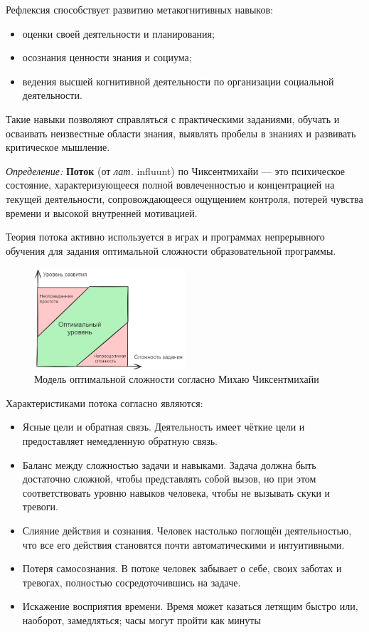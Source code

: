  Рефлексия способствует развитию метакогнитивных навыков:
  \begin{itemize}
     \item оценки своей деятельности и планирования;
     \item осознания ценности знания и социума;
     \item ведения высшей когнитивной деятельности по организации социальной деятельности.
 \end{itemize}
Такие навыки позволяют справляться с практическими заданиями, обучать и осваивать неизвестные области знания,
выявлять пробелы в знаниях и развивать критическое мышление.

\textit{Определение:} \textbf{Поток} (от \textit{лат.} influunt) по Чиксентмихайи --- это психическое состояние, характеризующееся полной вовлеченностью и концентрацией
на текущей деятельности, сопровождающееся ощущением контроля, потерей чувства времени и высокой внутренней мотивацией.

Теория потока активно используется в играх \cite{chen2007flow} и программах непрерывного обучения \cite{jarvis2009routledge} для
задания оптимальной сложности образовательной программы.

\begin{figure}[h]
    \centering
    \includegraphics[width=0.5\textwidth]{assets/pedagogic/psy/flow.excalidraw.png}
    \caption{Модель оптимальной сложности согласно Михаю Чиксентмихайи}
    \label{flow_model}
\end{figure}

Характеристиками потока согласно \cite{csikszentmihalyi2005flow} являются:
 \begin{itemize}
    \item Ясные цели и обратная связь. Деятельность имеет чёткие цели и предоставляет немедленную обратную связь.
    \item Баланс между сложностью задачи и навыками. Задача должна быть достаточно сложной, чтобы представлять собой вызов, 
    но при этом соответствовать уровню навыков человека, чтобы не вызывать скуки и тревоги.
    \item Слияние действия и сознания. Человек настолько поглощён деятельностью, что все его действия становятся почти автоматическими и интуитивными.
    \item Потеря самосознания. В потоке человек забывает о себе, своих заботах и тревогах, полностью сосредоточившись на задаче.
    \item Искажение восприятия времени. Время может казаться летящим быстро или, наоборот, замедляться; часы могут пройти как минуты
\end{itemize}


